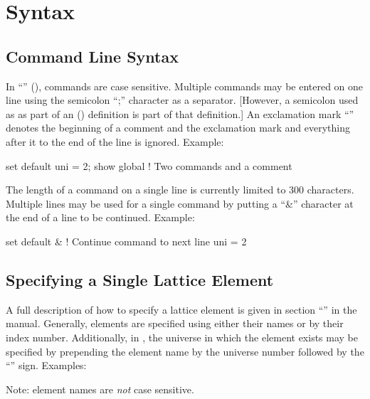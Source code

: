 \chapter{Syntax}
\label{c:syntax}

\section{Command Line Syntax}
\label{s:com.syntax}

In ``'' (), commands are case sensitive. Multiple commands may be
entered on one line using the semicolon ``;'' character as a separator.  [However, a semicolon used
as as part of an  () definition is part of that definition.]  An exclamation
mark ``\vn{!}''  denotes the beginning of a comment and the exclamation mark and everything after it
to the end of the line is ignored.  Example:
\begin{example}
  set default uni = 2; show global  ! Two commands and a comment
\end{example}

The length of a command on a single line is currently limited to 300 characters. Multiple lines may
be used for a single command by putting a ``\&'' character at the end of a line to be
continued. Example:
\begin{example}
  set default &    ! Continue command to next line
  uni = 2
\end{example}
     
\section{Specifying a Single Lattice Element}
\label{s:ele.name}

A full description of how to specify a lattice element is given in section 
``'' in the \bmad manual. Generally, elements are specified
using either their names or by their index number. Additionally, in \tao, the universe in which
the element exists may be specified by prepending the element name by the universe number followed by
the ``'' sign.
Examples:
Note: element names are {\em not} case sensitive.

